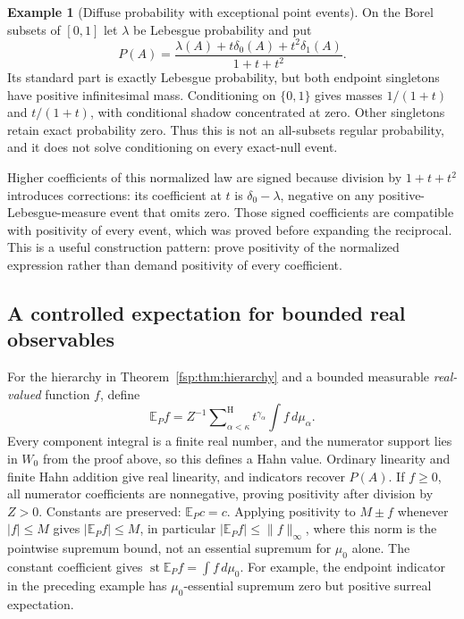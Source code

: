 \documentclass[11pt,a4paper]{article}
\numberwithin{equation}{section}
\theoremstyle{definition}
\newtheorem{example}[theorem]{Example}
\theoremstyle{remark}
\newcommand{\E}{\mathbb E}
\newcommand{\st}{\operatorname{st}}
\newcommand{\hsum}{\mathop{\sum}\nolimits^{\mathrm H}}
\newcommand{\norm}[1]{\lVert#1\rVert}
\begin{document}
\begin{example}[Diffuse probability with exceptional point events]
\label{fsp:ex:diffuse}
On the Borel subsets of $[0,1]$ let $\lambda$ be Lebesgue probability and
put
\begin{equation}
 P(A)=\frac{\lambda(A)+t\delta_0(A)+t^2\delta_1(A)}{1+t+t^2}.
\end{equation}
Its standard part is exactly Lebesgue probability, but both endpoint
singletons have positive infinitesimal mass. Conditioning on
$\{0,1\}$ gives masses $1/(1+t)$ and $t/(1+t)$, with conditional shadow
concentrated at zero. Other singletons retain exact probability zero.
Thus this is not an all-subsets regular probability, and it does not
solve conditioning on every exact-null event.
\end{example}

Higher coefficients of this normalized law are signed because division
by $1+t+t^2$ introduces corrections: its coefficient at $t$ is
$\delta_0-\lambda$, negative on any positive-Lebesgue-measure event
that omits zero. Those signed coefficients are
compatible with positivity of every event, which was proved before
expanding the reciprocal. This is a useful construction pattern: prove
positivity of the normalized expression rather than demand positivity
of every coefficient.

\subsection{A controlled expectation for bounded real observables}

For the hierarchy in Theorem~\ref{fsp:thm:hierarchy} and a bounded measurable
\emph{real-valued} function $f$, define
\begin{equation}\label{fsp:eq:hierintegral}
 \E_P f=Z^{-1}\hsum_{\alpha<\kappa}t^{\gamma_\alpha}
                  \int f\,d\mu_\alpha.
\end{equation}
Every component integral is a finite real number, and the numerator
support lies in $W_0$ from the proof above, so this defines a Hahn value.
Ordinary linearity and finite Hahn addition give real linearity, and
indicators recover $P(A)$. If $f\ge0$, all numerator coefficients are
nonnegative, proving positivity after division by $Z>0$. Constants are
preserved: $\E_Pc=c$. Applying positivity to $M\pm f$ whenever
$|f|\le M$ gives $|\E_Pf|\le M$, in particular
$|\E_Pf|\le\norm{f}_\infty$, where this norm is the pointwise
supremum bound, not an essential supremum for $\mu_0$ alone.
The constant coefficient gives $\st\E_Pf=\int f\,d\mu_0$.
For example, the endpoint indicator in the preceding example has
$\mu_0$-essential supremum zero but positive surreal expectation.
\end{document}
